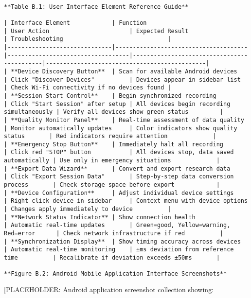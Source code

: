 \documentclass[12pt,a4paper]{report}
\begin{document}
\begin{verbatim}

**Table B.1: User Interface Element Reference Guide**

| Interface Element            | Function                             | User Action                       | Expected Result                            | Troubleshooting                              |
|------------------------------|--------------------------------------|-----------------------------------|--------------------------------------------|----------------------------------------------|
| **Device Discovery Button**  | Scan for available Android devices   | Click "Discover Devices"          | Devices appear in sidebar list             | Check Wi-Fi connectivity if no devices found |
| **Session Start Control**    | Begin synchronized recording         | Click "Start Session" after setup | All devices begin recording simultaneously | Verify all devices show green status         |
| **Quality Monitor Panel**    | Real-time assessment of data quality | Monitor automatically updates     | Color indicators show quality status       | Red indicators require attention             |
| **Emergency Stop Button**    | Immediately halt all recording       | Click red "STOP" button           | All devices stop, data saved automatically | Use only in emergency situations             |
| **Export Data Wizard**       | Convert and export research data     | Click "Export Session Data"       | Step-by-step data conversion process       | Check storage space before export            |
| **Device Configuration**     | Adjust individual device settings    | Right-click device in sidebar     | Context menu with device options           | Changes apply immediately to device          |
| **Network Status Indicator** | Show connection health               | Automatic real-time updates       | Green=good, Yellow=warning, Red=error      | Check network infrastructure if red          |
| **Synchronization Display**  | Show timing accuracy across devices  | Automatic real-time monitoring    | ±ms deviation from reference time          | Recalibrate if deviation exceeds ±50ms       |

**Figure B.2: Android Mobile Application Interface Screenshots**

\end{verbatim}
[PLACEHOLDER: Android application screenshot collection showing:
\end{document}
